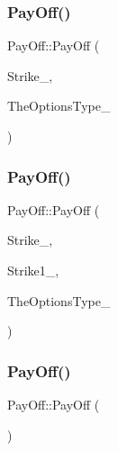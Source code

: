 \subsubsection{\texorpdfstring{Pay\+Off()}{PayOff()}\hspace{0.1cm}{\footnotesize\ttfamily [1/4]}}
{\footnotesize\ttfamily Pay\+Off\+::\+Pay\+Off (\begin{DoxyParamCaption}\item[{double}]{Strike\+\_\+,  }\item[{\hyperlink{classPayOff_a57262243a4bf56ddf5b78d7f563440c8}{Option\+Type}}]{The\+Options\+Type\+\_\+ }\end{DoxyParamCaption})}

\hypertarget{classPayOff_a185b279eeea3e2d52f5acb225eaf8d64}{}\label{classPayOff_a185b279eeea3e2d52f5acb225eaf8d64} 
\subsubsection{\texorpdfstring{Pay\+Off()}{PayOff()}\hspace{0.1cm}{\footnotesize\ttfamily [2/4]}}
{\footnotesize\ttfamily Pay\+Off\+::\+Pay\+Off (\begin{DoxyParamCaption}\item[{double}]{Strike\+\_\+,  }\item[{double}]{Strike1\+\_\+,  }\item[{\hyperlink{classPayOff_a57262243a4bf56ddf5b78d7f563440c8}{Option\+Type}}]{The\+Options\+Type\+\_\+ }\end{DoxyParamCaption})}

\hypertarget{classPayOff_ade8032093538388f53c706bda715f39f}{}\label{classPayOff_ade8032093538388f53c706bda715f39f} 
\subsubsection{\texorpdfstring{Pay\+Off()}{PayOff()}\hspace{0.1cm}{\footnotesize\ttfamily [3/4]}}
{\footnotesize\ttfamily Pay\+Off\+::\+Pay\+Off (\begin{DoxyParamCaption}{ }\end{DoxyParamCaption})\hspace{0.3cm}{\ttfamily [inline]}}

\hypertarget{classPayOff_ad7aa3a49e4a7e9cab7dc283d69a3f1ff}{}\label{classPayOff_ad7aa3a49e4a7e9cab7dc283d69a3f1ff} 
